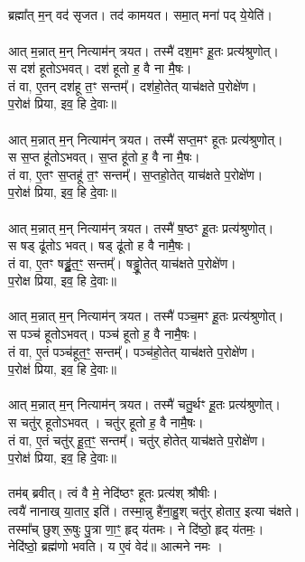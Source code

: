 \subsection{}
ब्रह्मा᳚त् म॒न् वद॑ सृजत। तद॑ कामयत। समा॒त् मना॑ पद् ये॒येति॑। \\
\\
आत् म॒न्नात् म॒न् नित्याम॑न् त्रयत। तस्मै॑ दश॒मꣳ हू॒तः प्रत्य॑श्रुणोत्।\\
स दश॑ हूतोऽभवत्। दश॑ हूतो ह॒ वै ना मै॒षः। \\
तं वा, ए॒तन् दश॑हू त॒ꣳ सन्तम्᳚। दश॑हो॒तेत् याच॑क्षते प॒रोक्षे॑ण। \\
प॒रोक्ष॑ प्रिया, इव॒ हि दे॒वाः॥\\
\\
आत् म॒न्नात् म॒न् नित्याम॑न् त्रयत। तस्मै॑ सप्त॒मꣳ हूतः प्रत्य॑श्रुणोत्। \\
स स॒प्त हू॑तोऽभवत्। स॒प्त हू॑तो ह॒ वै ना मै॒षः। \\
तं वा, ए॒तꣳ स॒प्तहू॑ त॒ꣳ सन्तम्᳚। स॒प्तहो॒तेत् याच॑क्षते प॒रोक्षे॑ण। \\
प॒रोक्ष॑ प्रिया, इव॒ हि दे॒वाः॥\\
\\
आत् म॒न्नात् म॒न् नित्याम॑न् त्रयत। तस्मै॑ ष॒ष्ठꣳ हू॒तः प्रत्य॑श्रुणोत्। \\
स षड् ढू॑तोऽ भवत्। षड् ढू॑तो ह वै नामै॒षः। \\
तं वा, ए॒तꣳ षड्ढू॒॑त॒ꣳ॒ सन्तम्᳚। षड्ढूो॒तेत् याच॑क्षते प॒रोक्षे॑ण। \\
प॒रोक्ष प्रिया, इव॒ हि दे॒वाः॥\\
\\
आत् म॒न्नात् म॒न् नित्याम॑न् त्रयत। तस्मै॑ पञ्च॒मꣳ हू॒तः प्रत्य॑श्रुणोत्। \\
स पञ्च॑ हूतोऽभवत्। पञ्च॑ हूतो ह॒ वै नामै॒षः। \\
तं वा, ए॒तं पञ्च॑हूत॒ꣳ॒ सन्तम्᳚। पञ्च॑हो॒तेत् याच॑क्षते प॒रोक्षे॑ण। \\
प॒रोक्ष॑ प्रिया, इव॒ हि दे॒वाः॥\\
\\
आत् म॒न्नात् म॒न् नित्याम॑न् त्रयत। तस्मै॑ चतु॒र्थꣳ हू॒तः प्रत्य॑श्रुणोत्। \\
स चतु॑र् हूतोऽभवत् । चतु॑र् हूतो ह॒ वै नामै॒षः। \\
तं वा,  ए॒तं चतु॑र् हू॒त॒ꣳ॒ सन्तम्᳚। चतु॑र् होतेत् याच॑क्षते प॒रोक्षे॑ण। \\
प॒रोक्ष॑ प्रिया, इव॒ हि दे॒वाः॥\\
\\
तम॑ब् ब्रवीत्। त्वं वै मे॒ नेदि॑ष्ठꣳ हूतः प्रत्य॑श् श्रौषीः। \\
त्वयै॑ नानाख् या॒तार॒ इति॑। तस्मा॒न्नु है॑ना॒हु॒श् चतु॑र् होतार॒ इत्या च॑क्षते। \\
तस्मा᳚च् छुश् रू॒षुः पु॒त्रा णा॒ꣳ॒ हृद् य॑तमः। ने दि॑ष्ठो॒ हृद् य॑तमः॒।\\
नेदि॑ष्ठो॒ ब्रह्म॑णो भवति। य ए॒वं वेद॑॥ आत्मने नमः ।\\
